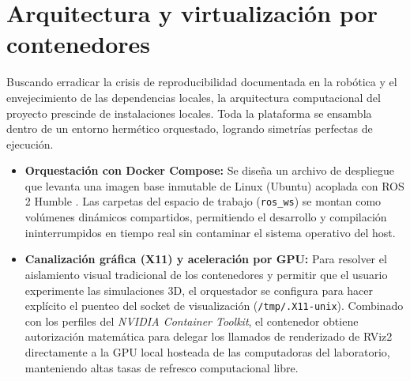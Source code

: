 \section{Arquitectura y virtualización por contenedores}
Buscando erradicar la crisis de reproducibilidad documentada en la robótica y el envejecimiento de las dependencias locales, la arquitectura computacional del proyecto prescinde de instalaciones locales. Toda la plataforma se ensambla dentro de un entorno hermético orquestado, logrando simetrías perfectas de ejecución.
\begin{itemize}
    \item \textbf{Orquestación con Docker Compose:} Se diseña un archivo de despliegue que levanta una imagen base inmutable de Linux (Ubuntu) acoplada con ROS 2 Humble \parencite{macenski2022robot}. Las carpetas del espacio de trabajo (\texttt{ros\_ws}) se montan como volúmenes dinámicos compartidos, permitiendo el desarrollo y compilación ininterrumpidos en tiempo real sin contaminar el sistema operativo del host.
    \item \textbf{Canalización gráfica (X11) y aceleración por GPU:} Para resolver el aislamiento visual tradicional de los contenedores y permitir que el usuario experimente las simulaciones 3D, el orquestador se configura para hacer explícito el puenteo del socket de visualización (\texttt{/tmp/.X11-unix}). Combinado con los perfiles del \textit{NVIDIA Container Toolkit}, el contenedor obtiene autorización matemática para delegar los llamados de renderizado de RViz2 directamente a la GPU local hosteada de las computadoras del laboratorio, manteniendo altas tasas de refresco computacional libre.
\end{itemize}

